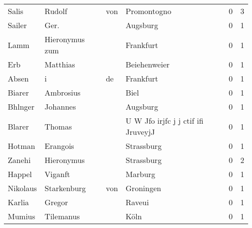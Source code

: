 \begin{tabular}{llllrr}
                    Salis &                             Rudolf &         von &                                 Promontogno &          0 &         3 \\
                   Sailer &                               Ger. &             &                                    Augsburg &          0 &         1 \\
                     Lamm &                     Hieronymus zum &             &                                   Frankfurt &          0 &         1 \\
                      Erb &                           Matthias &             &                                Beiehenweier &          0 &         1 \\
                    Absen &                                  i &          de &                                   Frankfurt &          0 &         1 \\
                   Biarer &                          Ambrosius &             &                                        Biel &          0 &         1 \\
                  Bhlnger &                           Johannes &             &                                    Augsburg &          0 &         1 \\
                   Blarer &                             Thomas &             &         U W Jfo irjfc j j ctif ifi JruveyjJ &          0 &         1 \\
                   Hotman &                           Erangois &             &                                  Strassburg &          0 &         1 \\
                   Zanehi &                         Hieronymus &             &                                  Strassburg &          0 &         2 \\
                   Happel &                            Viganft &             &                                     Marburg &          0 &         1 \\
                 Nikolaus &                        Starkenburg &         von &                                   Groningen &          0 &         1 \\
                   Karlia &                             Gregor &             &                                      Raveui &          0 &         1 \\
                   Mumius &                          Tilemanus &             &                                        Köln &          0 &         1 \\

\end{tabular}
